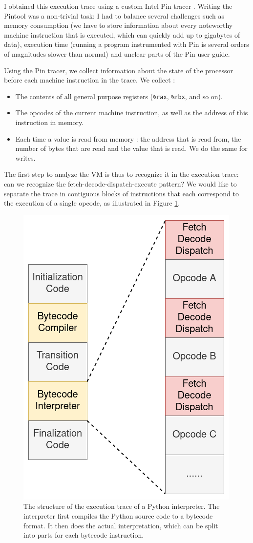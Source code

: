 \documentclass[english]{article}
\begin{document}
I obtained this execution trace using a custom Intel Pin tracer \cite{intelpin}. Writing the Pintool was a non-trivial task: I had to balance several challenges such as memory consumption (we have to store information about every noteworthy machine instruction that is executed, which can quickly add up to gigabytes of data), execution time (running a program instrumented with Pin is several orders of magnitudes slower than normal) and unclear parts of the Pin user guide.

Using the Pin tracer, we collect information about the state of the processor before each machine instruction in the trace. We collect : 
\begin{itemize}
	\item The contents of all general purpose registers (\texttt{\%rax}, \texttt{\%rbx}, and so on).
	\item The opcodes of the current machine instruction, as well as the address of this instruction in memory.
	\item Each time a value is read from memory : the address that is read from, the number of bytes that are read and the value that is read. We do the same for writes.
\end{itemize}

The first step to analyze the VM is thus to recognize it in the execution trace: can we recognize the fetch-decode-dispatch-execute pattern? We would like to separate the trace in contiguous blocks of instructions that each correspond to the execution of a single opcode, as illustrated in Figure \ref{fig:trace}.

\begin{figure}[htp]
	\centering 
	\includegraphics[width=.3\linewidth]{img/Trace.png}
	\caption{The structure of the execution trace of a Python interpreter. The interpreter first compiles the Python source code to a bytecode format. It then does the actual interpretation, which can be split into parts for each bytecode instruction.}
	\label{fig:trace}
\end{figure}
\end{document}
